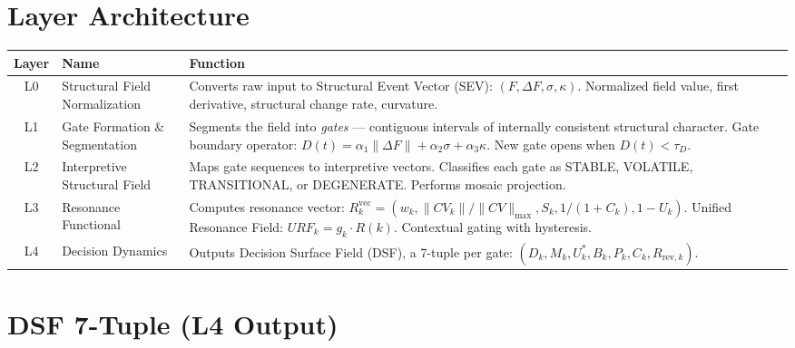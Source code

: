 \documentclass[11pt, a4paper]{article}
\begin{document}
\section{Layer Architecture}

\begin{center}
\begin{tabular}{@{}clp{7cm}@{}}
\toprule
\textbf{Layer} & \textbf{Name} & \textbf{Function} \\
\midrule
L0 & Structural Field Normalization &
  Converts raw input to Structural Event Vector (SEV):
  $(F, \Delta F, \sigma, \kappa)$. Normalized field value,
  first derivative, structural change rate, curvature. \\
L1 & Gate Formation \& Segmentation &
  Segments the field into \textit{gates} --- contiguous
  intervals of internally consistent structural character.
  Gate boundary operator:
  $D(t) = \alpha_1\|\Delta F\| + \alpha_2\sigma + \alpha_3\kappa$.
  New gate opens when $D(t) < \tau_D$. \\
L2 & Interpretive Structural Field &
  Maps gate sequences to interpretive vectors. Classifies
  each gate as STABLE, VOLATILE, TRANSITIONAL, or DEGENERATE.
  Performs mosaic projection. \\
L3 & Resonance Functional &
  Computes resonance vector:
  $R^{\text{vec}}_k = (w_k, \|CV_k\|/\|CV\|_{\max}, S_k,
  1/(1+C_k), 1-U_k)$.
  Unified Resonance Field: $URF_k = g_k \cdot R(k)$.
  Contextual gating with hysteresis. \\
L4 & Decision Dynamics &
  Outputs Decision Surface Field (DSF), a 7-tuple per gate:
  $(D_k, M_k, U^*_k, B_k, P_k, C_k, R_{\text{rev},k})$. \\
\bottomrule
\end{tabular}
\end{center}

\section{DSF 7-Tuple (L4 Output)}
\end{document}
